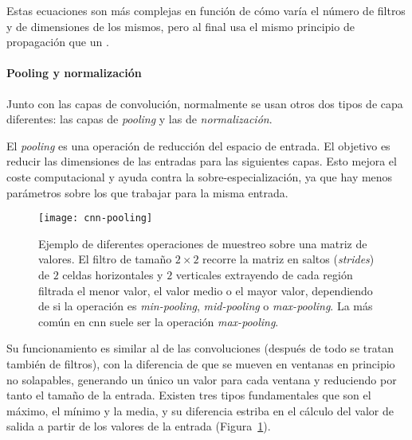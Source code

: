 Estas ecuaciones son más complejas en función de cómo varía el número de filtros y de dimensiones de los mismos, pero al final usa el mismo principio de propagación que un .

\paragraph{Pooling y normalización}

Junto con las capas de convolución, normalmente se usan otros dos tipos de capa diferentes: las capas de \textit{pooling} y las de \textit{normalización}.

El \textit{pooling} es una operación de reducción del espacio de entrada. El objetivo es reducir las dimensiones de las entradas para las siguientes capas. Esto mejora el coste computacional y ayuda contra la sobre-especialización, ya que hay menos parámetros sobre los que trabajar para la misma entrada.

\begin{figure}[t]
	\centering
	\texttt{[image: cnn-pooling]}
	\caption[Diferentes operaciones de muestreo]{Ejemplo de diferentes operaciones de muestreo sobre una matriz de valores. El filtro de tamaño $2 \times 2$ recorre la matriz en saltos (\textit{strides}) de $2$ celdas horizontales y $2$ verticales extrayendo de cada región filtrada el menor valor, el valor medio o el mayor valor, dependiendo de si la operación es \textit{min-pooling}, \textit{mid-pooling} o \textit{max-pooling}. La más común en \acrshort{cnn} suele ser la operación \textit{max-pooling}.}
	\label{fig:cnn-max-pooling}
\end{figure}

Su funcionamiento es similar al de las convoluciones (después de todo se tratan también de filtros), con la diferencia de que se mueven en ventanas en principio no solapables, generando un único un valor para cada ventana y reduciendo por tanto el tamaño de la entrada. Existen tres tipos fundamentales que son el máximo, el mínimo y la media, y su diferencia estriba en el cálculo del valor de salida a partir de los valores de la entrada (Figura~\ref{fig:cnn-max-pooling}).


